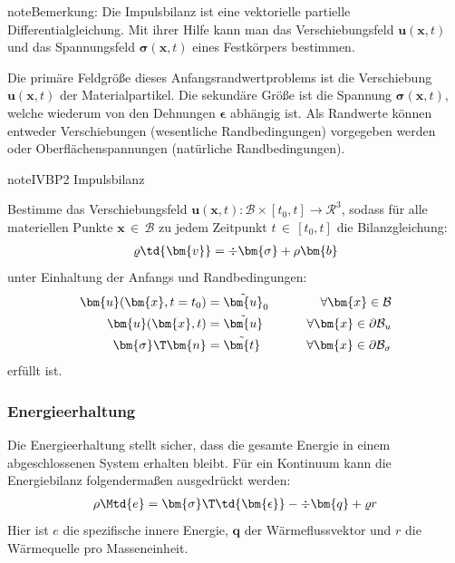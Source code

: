 \documentclass[letterpaper,10pt,german]{jupyterBook}
\begin{document}
\begin{sphinxadmonition}{note}{Bemerkung:}
\sphinxAtStartPar
Die Impulsbilanz ist eine vektorielle partielle Differentialgleichung. Mit ihrer Hilfe kann man das Verschiebungsfeld \(\bm{u}(\bm{x},t)\) und das Spannungsfeld \(\bm{\sigma}(\bm{x},t)\) eines Festkörpers bestimmen.
\end{sphinxadmonition}

\sphinxAtStartPar
Die primäre Feldgröße dieses Anfangsrandwertproblems ist die Verschiebung \(\bm{u}(\bm{x},t)\) der Materialpartikel. Die sekundäre Größe ist die Spannung \(\bm{\sigma}(\bm{x},t)\), welche wiederum von den Dehnungen \(\bm{\epsilon}\) abhängig ist. Als Randwerte können entweder Verschiebungen (wesentliche Randbedingungen) vorgegeben werden oder Oberflächenspannungen (natürliche Randbedingungen).

\begin{sphinxadmonition}{note}{IVBP2 \sphinxhyphen{} Impulsbilanz}

\sphinxAtStartPar
Bestimme das Verschiebungsfeld \(\bm{u}(\bm{x},t): \mathcal{B} \times [t_0,t] \rightarrow \mathcal{R}^3\), sodass für alle materiellen Punkte \(\bm{x} \, \in \, \mathcal{B}\) zu jedem Zeitpunkt \(t \, \in \, [t_0,t]\) die Bilanzgleichung:
\begin{equation*}
\begin{split}
\varrho \td{\bm{v}} =\div{\bm{\sigma}} + \rho \bm{b} 
\end{split}
\end{equation*}
\sphinxAtStartPar
unter Einhaltung der Anfangs\sphinxhyphen{} und Randbedingungen:
\begin{equation*}
\begin{split}
\bm{u}(\bm{x},t=t_0) & = \tilde{\bm{u}}_0 \qquad &\forall \bm{x} \in \mathcal{B}& \\
\bm{u}(\bm{x},t) & = \tilde{\bm{u}} \qquad &\forall \bm{x} \in \partial \mathcal{B}_u& \\
\bm{\sigma}\T \bm{n} & = \tilde{\bm{t}} \qquad &\forall \bm{x} \in \partial\mathcal{B}_{\sigma}&
\end{split}
\end{equation*}
\sphinxAtStartPar
erfüllt ist.
\end{sphinxadmonition}




\subsubsection{Energieerhaltung}
\label{\detokenize{chapters/chapter1/elasticity:energieerhaltung}}
\sphinxAtStartPar
Die Energieerhaltung stellt sicher, dass die gesamte Energie in einem abgeschlossenen System erhalten bleibt. Für ein Kontinuum kann die Energiebilanz folgendermaßen ausgedrückt werden:
\begin{equation}\label{equation:chapters/chapter1/elasticity:1HS_01}
\begin{split}\rho \Mtd{e} = \bm{\sigma}\T \td{\bm{\epsilon}} - \div{\bm{q}} + \varrho r\end{split}
\end{equation}
\sphinxAtStartPar
Hier ist \(e\) die spezifische innere Energie, \(\bm{q}\) der Wärmeflussvektor und \(r\) die Wärmequelle pro Masseneinheit.
\end{document}
